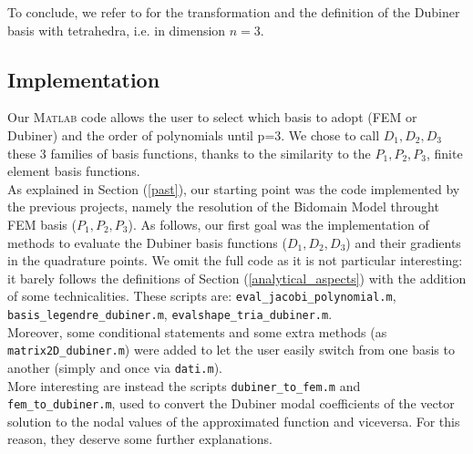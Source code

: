 \documentclass[a4paper,11pt]{article}
\begin{document}
    \noindent To conclude, we refer to \cite{sherwin} for the transformation and the definition of the Dubiner basis with tetrahedra, i.e. in dimension $n=3$.
    
    \subsection{Implementation}\label{subsection_implementation}
    Our \textsc{Matlab} code allows the user to select which basis to adopt (FEM or Dubiner) and the order of polynomials until p=3. We chose to call $D_1,D_2,D_3$ these 3 families of basis functions, thanks to the similarity to the $P_1,P_2,P_3$, finite element basis functions.\\
    As explained in Section (\ref{past}), our starting point was the code implemented by the previous projects, namely the resolution of the Bidomain Model throught FEM basis ($P_1,P_2,P_3$). As follows, our first goal was the implementation of methods to evaluate the Dubiner basis functions ($D_1,D_2,D_3$) and their gradients in the quadrature points. We omit the full code as it is not particular interesting: it barely follows the definitions of Section (\ref{analytical_aspects}) with the addition of some technicalities. These scripts are: \texttt{eval\_jacobi\_polynomial.m}, \texttt{basis\_legendre\_dubiner.m}, \texttt{evalshape\_tria\_dubiner.m}.\\
    
    \noindent Moreover, some conditional statements and some extra methods (as \texttt{matrix2D\_dubiner.m}) were added to let the user easily switch from one basis to another (simply and once via \texttt{dati.m}). \\
    
    \noindent More interesting are instead the scripts \texttt{dubiner\_to\_fem.m} and \texttt{fem\_to\_dubiner.m}, used to convert the Dubiner modal coefficients of the vector solution to the nodal values of the approximated function and viceversa. For this reason, they deserve some further explanations.
\end{document}
